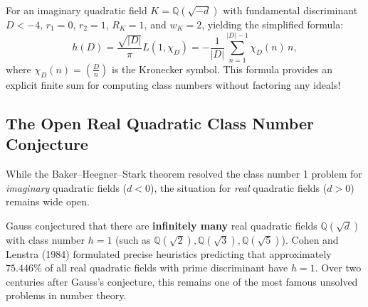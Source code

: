 \documentclass[a4paper]{article}
\begin{document}
For an imaginary quadratic field $K = \mathbb{Q}(\sqrt{-d})$ with fundamental discriminant $D < -4$, $r_1 = 0$, $r_2 = 1$, $R_K = 1$, and $w_K = 2$, yielding the simplified formula:
\begin{equation}
 h(D) = \frac{\sqrt{|D|}}{\pi} L(1, \chi_D) = -\frac{1}{|D|} \sum_{n=1}^{|D|-1} \chi_D(n) \, n,
\end{equation}
where $\chi_D(n) = \left(\frac{D}{n}\right)$ is the Kronecker symbol. This formula provides an explicit finite sum for computing class numbers without factoring any ideals!

\subsection{The Open Real Quadratic Class Number Conjecture}
While the Baker--Heegner--Stark theorem resolved the class number 1 problem for \emph{imaginary} quadratic fields ($d < 0$), the situation for \emph{real} quadratic fields ($d > 0$) remains wide open.

Gauss conjectured that there are \textbf{infinitely many} real quadratic fields $\mathbb{Q}(\sqrt{d})$ with class number $h = 1$ (such as $\mathbb{Q}(\sqrt{2}), \mathbb{Q}(\sqrt{3}), \mathbb{Q}(\sqrt{5})$). Cohen and Lenstra (1984) formulated precise heuristics predicting that approximately $75.446\%$ of all real quadratic fields with prime discriminant have $h = 1$. Over two centuries after Gauss's conjecture, this remains one of the most famous unsolved problems in number theory.
\end{document}
